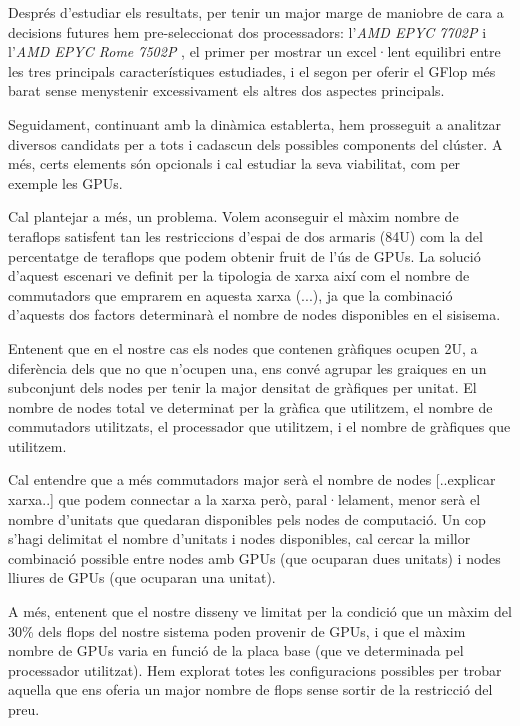 \documentclass{article}
\begin{document}
Després d'estudiar els resultats, per tenir un major marge de maniobre de cara a decisions futures hem pre-seleccionat dos processadors: l'\textit{AMD EPYC 7702P} \cite{AMDE7702P} i l'\textit{AMD EPYC Rome 7502P} \cite{AMDER7502P}, el primer per mostrar un excel·lent equilibri entre les tres principals característiques estudiades, i el segon per oferir el GFlop més barat sense menystenir excessivament els altres dos aspectes principals.

Seguidament, continuant amb la dinàmica establerta, hem prosseguit a analitzar diversos candidats per a tots i cadascun dels possibles components del clúster. A més, certs elements són opcionals i cal estudiar la seva viabilitat, com per exemple les GPUs.


Cal plantejar a més, un problema. Volem aconseguir el màxim nombre de teraflops satisfent tan les restriccions d'espai de dos armaris (84U) com la del percentatge de teraflops que podem obtenir fruit de l'ús de GPUs. La solució d'aquest escenari ve definit per la tipologia de xarxa així com el nombre de commutadors que emprarem en aquesta xarxa (...), ja que la combinació d'aquests dos factors determinarà el nombre de nodes disponibles en el sisisema.

Entenent que en el nostre cas els nodes que contenen gràfiques ocupen 2U, a diferència dels que no que n'ocupen una, ens convé agrupar les graiques en un subconjunt dels nodes per tenir la major densitat de gràfiques per unitat. El nombre de nodes total ve determinat per la gràfica que utilitzem, el nombre de commutadors utilitzats, el processador que utilitzem, i el nombre de gràfiques que utilitzem. 

Cal entendre que a més commutadors major serà el nombre de nodes [..explicar xarxa..] que podem connectar a la xarxa però, paral·lelament, menor serà el nombre d'unitats que quedaran disponibles pels nodes de computació. Un cop s'hagi delimitat el nombre d'unitats i nodes disponibles, cal cercar la millor combinació possible entre nodes amb GPUs (que ocuparan dues unitats) i nodes lliures de GPUs (que ocuparan una unitat).

A més, entenent que el nostre disseny ve limitat per la condició que un màxim del 30\% dels flops del nostre sistema poden provenir de GPUs, i que el màxim nombre de GPUs varia en funció de la placa base (que ve determinada pel processador utilitzat). Hem explorat totes les configuracions possibles per trobar aquella que ens oferia un major nombre de flops sense sortir de la restricció del preu.
\end{document}
